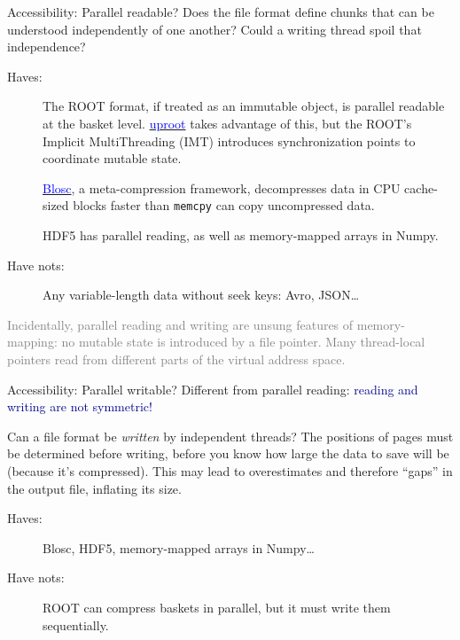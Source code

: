 \documentclass[aspectratio=169]{beamer}
\begin{document}
\begin{frame}{Accessibility: Parallel readable?}
\vspace{0.5 cm}
Does the file format define chunks that can be understood independently of one another? Could a writing thread spoil that independence?

\vfill

\begin{description}
\item[Haves:] The ROOT format, if treated as an immutable object, is parallel readable at the basket level. \href{https://github.com/scikit-hep/uproot}{\textcolor{blue}{uproot}} takes advantage of this, but the ROOT's Implicit MultiThreading (IMT) introduces synchronization points to coordinate mutable state.

\vspace{0.1 cm}
\href{http://blosc.org/pages/blosc-in-depth/}{\textcolor{blue}{Blosc}}, a meta-compression framework, decompresses data in CPU cache-sized blocks faster than {\tt\small memcpy} can copy uncompressed data.

\vspace{0.1 cm}
HDF5 has parallel reading, as well as memory-mapped arrays in Numpy.

\item[Have nots:] Any variable-length data without seek keys: Avro, JSON\ldots
\end{description}

\vfill

\textcolor{gray}{Incidentally, parallel reading and writing are unsung features of memory-mapping: no mutable state is introduced by a file pointer. Many thread-local pointers read from different parts of the virtual address space.}
\end{frame}

\begin{frame}{Accessibility: Parallel writable?}
\vspace{0.5 cm}
Different from parallel reading: \textcolor{darkblue}{reading and writing are not symmetric!}

\vspace{0.5 cm}
Can a file format be {\it written} by independent threads? The positions of pages must be determined before writing, before you know how large the data to save will be (because it's compressed). This may lead to overestimates and therefore ``gaps'' in the output file, inflating its size.

\vspace{0.5 cm}

\begin{description}
\item[Haves:] Blosc, HDF5, memory-mapped arrays in Numpy\ldots
\item[Have nots:] ROOT can compress baskets in parallel, but it must write them sequentially.
\end{description}
\end{frame}
\end{document}
